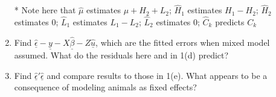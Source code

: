 \documentclass[12pt,a4paper]{paper}
\begin{document}
\begin{enumerate}
\begin{enumerate}
\item[*] Note here that $\hat{\mu}$ estimates $\mu + H_{2} + L_{2}$; $\hat{H}_{1}$ estimates $H_{1} - H_{2}$; $\hat{H}_{2}$ estimates $0$; $\hat{L}_{1}$ estimates $L_{1} - L_{2}$; $\hat{L}_{2}$ estimates $0$; $\hat{C}_{k}$ predicts $C_{k}$
\item Find $\underline{\hat{\epsilon}} - \underline{y} - X\underline{\hat{\beta}} - Z\underline{\hat{u}}$, which are the fitted errors when mixed model assumed. What do the residuals here and in 1(d) predict?
\item Find $\underline{\hat{\epsilon}}'\underline{\hat{\epsilon}}$ and compare results to those in 1(e). What appears to be a consequence of modeling animals as fixed effects?
\end{enumerate}
\end{enumerate}
\end{document}
